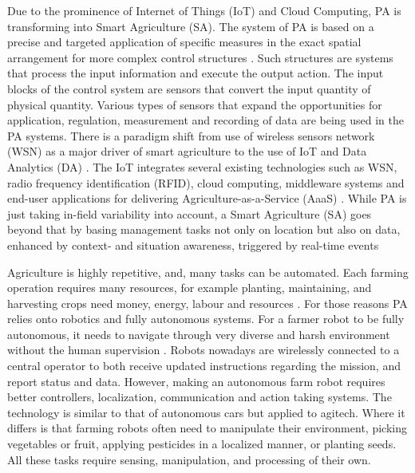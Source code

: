\documentclass[review]{elsarticle}
\begin{document}
Due to the prominence of Internet of Things (IoT) and Cloud Computing, PA is transforming into Smart Agriculture (SA). The system of PA is based on a precise and targeted application of specific measures in the exact spatial arrangement for more complex control structures \cite{Mekala_2017}. Such structures are systems that process the input information and execute the output action. The input blocks of the control system are sensors that convert the input quantity of physical quantity. Various types of sensors that expand the opportunities for application, regulation, measurement and recording of data are being used in the PA systems. There is a paradigm shift from use of wireless sensors network (WSN) as a major driver of smart agriculture to the use of IoT and Data Analytics (DA) \cite{Elijah_2018}. The IoT integrates several existing technologies such as WSN, radio frequency identification (RFID), cloud computing, middleware systems and end-user applications for delivering Agriculture-as-a-Service (AaaS) \cite{Gill_2017, Sto_es_2016}. While PA is just taking in-field variability into account, a Smart Agriculture (SA) goes beyond that by basing management tasks not only on location but also on data, enhanced by context- and situation awareness, triggered by real-time events \cite{Wolfert_2017, Pivoto_2018, O_Grady_2017, Kaloxylos_2012}

Agriculture is highly repetitive, and, many tasks can be automated. Each farming operation requires many resources, for example planting, maintaining, and harvesting crops need money, energy, labour and resources \cite{Brown20121427}. For those reasons PA relies onto robotics and fully autonomous systems. For a farmer robot to be fully autonomous, it needs to navigate through very diverse and harsh environment without the human supervision \cite{Slaughter_2008}. Robots nowadays are wirelessly connected to a central operator to both receive updated instructions regarding the mission, and report status and data. However, making an autonomous farm robot requires better controllers, localization, communication and action taking systems. The technology is similar to that of autonomous cars but applied to agitech. Where it differs is that farming robots often need to manipulate their environment, picking vegetables or fruit, applying pesticides in a localized manner, or planting seeds. All these tasks require sensing, manipulation, and processing of their own.
\end{document}
